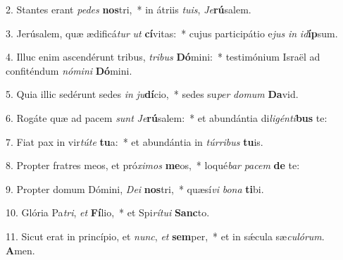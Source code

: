 2. Stantes erant \textit{pe}\textit{des} \textbf{nos}tri,~*  in átriis \textit{tu}\textit{is}, \textit{Je}\textbf{rú}salem.\

3. Jerúsalem, quæ ædificá\textit{tur} \textit{ut} \textbf{cí}vitas:~*  cujus participátio e\textit{jus} \textit{in} \textit{id}\textbf{íp}sum.\

4. Illuc enim ascendérunt tribus, \textit{tri}\textit{bus} \textbf{Dó}mini:~*  testimónium Israël ad confiténdum \textit{nó}\textit{mi}\textit{ni} \textbf{Dó}mini.\

5. Quia illic sedérunt sedes \textit{in} \textit{ju}\textbf{dí}cio,~*  sedes su\textit{per} \textit{do}\textit{mum} \textbf{Da}vid.\

6. Rogáte quæ ad pacem \textit{sunt} \textit{Je}\textbf{rú}salem:~*  et abundántia di\textit{li}\textit{gén}\textit{ti}\textbf{bus} te:\

7. Fiat pax in vir\textit{tú}\textit{te} \textbf{tu}a:~*  et abundántia in \textit{túr}\textit{ri}\textit{bus} \textbf{tu}is.\

8. Propter fratres meos, et pró\textit{xi}\textit{mos} \textbf{me}os,~*  loqué\textit{bar} \textit{pa}\textit{cem} \textbf{de} te:\

9. Propter domum Dómini, \textit{De}\textit{i} \textbf{nos}tri,~*  quæsí\textit{vi} \textit{bo}\textit{na} \textbf{ti}bi.\

10. Glória Pa\textit{tri}, \textit{et} \textbf{Fí}lio,~*  et Spi\textit{rí}\textit{tu}\textit{i} \textbf{Sanc}to.\

11. Sicut erat in princípio, et \textit{nunc}, \textit{et} \textbf{sem}per,~*  et in sǽcula sæ\textit{cu}\textit{ló}\textit{rum}. \textbf{A}men.\

